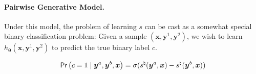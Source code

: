 \documentclass[11pt,a4paper]{article}
\begin{document}
\paragraph{Pairwise Generative Model.}
Under this model, the problem of learning $s$ can be cast as a somewhat special binary classification problem: Given a sample $(\bm{x}, \bm{y}^1, \bm{y}^2)$, we wish to learn $h_{\boldsymbol \theta}(\bm{x}, \bm{y}^{1}, \bm{y}^{2})$ to predict the true binary label $c$.
\begin{tcolorbox}[center]
\begin{equation}
\label{eq:bt_generative_model}
\textsf{Pr}\left(c = 1 \mid \bm{y}^{a}, \bm{y}^{b}, \bm{x}\right) = \sigma(s^{\natural}(\bm{y}^{a}, \bm{x}) - s^{\natural}(\bm{y}^{b},\bm{x}))
\end{equation}
\end{tcolorbox}
\end{document}
